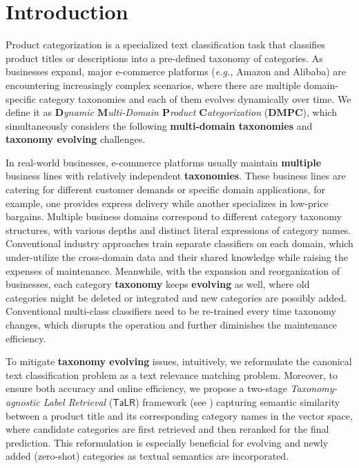 \section{Introduction}

Product categorization \cite{ding2002goldenbullet} is a specialized 
text classification task that classifies product titles or descriptions 
into a pre-defined taxonomy of categories.
As businesses expand, major e-commerce platforms (\textit{e.g.,} Amazon and Alibaba) are encountering increasingly complex scenarios, 
where there are multiple domain-specific category taxonomies and each of them evolves dynamically over time.
We define it as \textit{$\mathbf{D}$ynamic $\mathbf{M}$ulti-Domain $\mathbf{P}$roduct $\mathbf{C}$ategorization} ($\mathbf{DMPC}$), which simultaneously considers the following \textbf{multi-domain taxonomies} and \textbf{taxonomy evolving} challenges.

In real-world businesses, e-commerce platforms usually maintain \textbf{multiple} business lines with relatively independent \textbf{taxonomies}.
These business lines are catering for different customer demands or
specific domain applications, 
for example, one provides express delivery while another specializes in 
low-price bargains.
Multiple business domains correspond to different category taxonomy structures, with various depths and distinct literal expressions of category names. 
Conventional industry approaches train separate classifiers on each domain, which under-utilize the cross-domain data and their shared knowledge while 
raising the expenses of maintenance.
Meanwhile, with the expansion and reorganization of businesses, 
each category \textbf{taxonomy} keeps \textbf{evolving} as well, where 
old categories might be deleted or integrated and new categories are possibly added.
Conventional multi-class classifiers need to be re-trained every time 
taxonomy changes, which 
disrupts the operation and further diminishes the maintenance efficiency.

To mitigate \textbf{taxonomy evolving} issues, 
intuitively, we reformulate the canonical text classification problem as a text relevance matching problem. Moreover, to ensure both accuracy and online efficiency, we propose a two-stage \textit{Taxonomy-agnostic Label Retrieval} ($\mathsf{TaLR}$) framework (see ) capturing semantic similarity between a product title and its corresponding category names in the vector space, where candidate categories are first retrieved and then reranked for the final prediction.
This reformulation is especially beneficial for evolving and newly added (zero-shot) categories as textual semantics are incorporated. 

